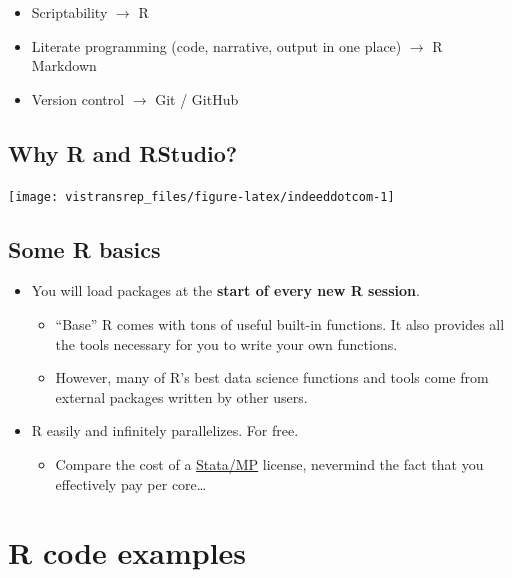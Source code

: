 \documentclass[]{book}
\providecommand{\tightlist}{%
  \setlength{\itemsep}{0pt}\setlength{\parskip}{0pt}}
\begin{document}
\begin{itemize}
\tightlist
\item
  Scriptability \(\rightarrow\) R
\item
  Literate programming (code, narrative, output in one place) \(\rightarrow\) R Markdown
\item
  Version control \(\rightarrow\) Git / GitHub
\end{itemize}

\hypertarget{why-r-and-rstudio}{%
\subsection{Why R and RStudio?}\label{why-r-and-rstudio}}

\begin{flushright}\texttt{[image: vistransrep\_files/figure-latex/indeeddotcom-1]} \end{flushright}

\hypertarget{some-r-basics}{%
\subsection{Some R basics}\label{some-r-basics}}

\begin{itemize}
\tightlist
\item
  You will load packages at the \textbf{start of every new R session}.

  \begin{itemize}
  \tightlist
  \item
    ``Base'' R comes with tons of useful built-in functions. It also provides all the tools necessary for you to write your own functions.
  \item
    However, many of R's best data science functions and tools come from external packages written by other users.
  \end{itemize}
\item
  R easily and infinitely parallelizes. For free.

  \begin{itemize}
  \tightlist
  \item
    Compare the cost of a \href{https://www.stata.com/statamp/}{Stata/MP} license, nevermind the fact that you effectively pay per core\ldots{}
  \end{itemize}
\end{itemize}

\hypertarget{r-code-examples}{%
\section{R code examples}\label{r-code-examples}}
\end{document}
